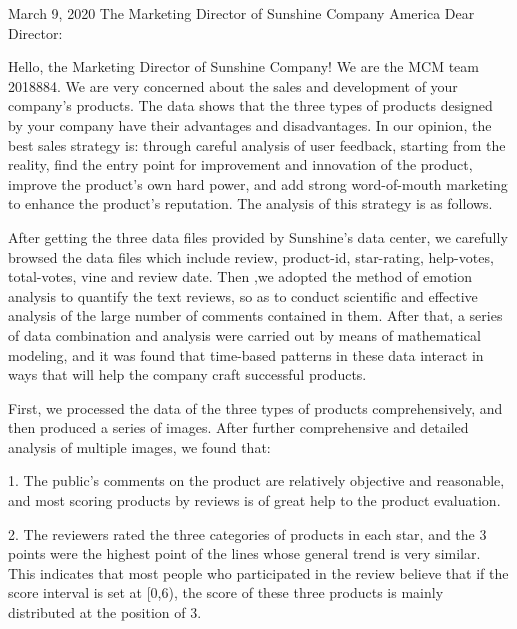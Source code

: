 \documentclass[12pt]{article}
\begin{document}
\quad\newline\par
\quad\quad\quad\quad\quad\quad\quad\quad\quad\quad\quad\quad\quad\quad
\quad\quad\quad\quad\quad\quad\quad\quad\quad\quad\quad\quad\quad\quad
March 9, 2020\newline
\quad\newline
The Marketing Director of Sunshine Company\newline
America\newline
\quad\newline
Dear Director:\par
Hello, the Marketing Director of Sunshine Company! We are the MCM team 2018884. We are very concerned about the sales and development of your company's products. The data shows that the three types of products designed by your company have their advantages and disadvantages. In our opinion, the best sales strategy is: through careful analysis of user feedback, starting from the reality, find the entry point for improvement and innovation of the product, improve the product's own hard power, and add strong word-of-mouth marketing to enhance the product's reputation. The analysis of this strategy is as follows.
\par
After getting the three data files provided by Sunshine's data center, we carefully browsed the data files which include review, product-id, star-rating, help-votes, total-votes, vine and review date. Then ,we adopted the method of emotion analysis to quantify the text reviews, so as to conduct scientific and effective analysis of the large number of comments contained in them. After that, a series of data combination and analysis were carried out by means of mathematical modeling, and it was found that time-based patterns in these data interact in ways that will help the company craft successful products.
\par
First, we processed the data of the three types of products comprehensively, and then produced a series of images. After further comprehensive and detailed analysis of multiple images, we found that:
\par
1. The public's comments on the product are relatively objective and reasonable, and most scoring products by reviews is of great help to the product evaluation.
\par
2. The reviewers rated the three categories of products in each star, and the 3 points were the highest point of the lines whose general trend is very similar. This indicates that most people who participated in the review believe that if the score interval is set at [0,6), the score of these three products is mainly distributed at the position of 3.
\end{document}
